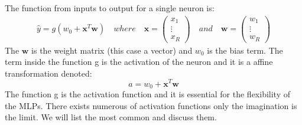 The function from inputs to output for a single neuron is:
\begin{align}   
\hat{y}=g(w_0 + \bm{x}^T \bm{w}) \quad where \quad \bm{x}=\begin{pmatrix}
x_1 \\
\vdots\\
x_R
\end{pmatrix} \quad and \quad \bm{w}=\begin{pmatrix}
w_1 \\
\vdots \\
w_R
\end{pmatrix}
\end{align}
The $\bm{w}$ is the weight matrix (this case a vector) and $w_0$ is the bias term. The term inside the function g is the activation of the neuron and it is a affine transformation denoted:
$$a= w_0 + \bm{x}^T \bm{w}$$
The function g is the activation function and it is essential for the flexibility of the MLPs. There exists numerous of activation functions only the imagination is the limit. We will list the most common and discuss them.


